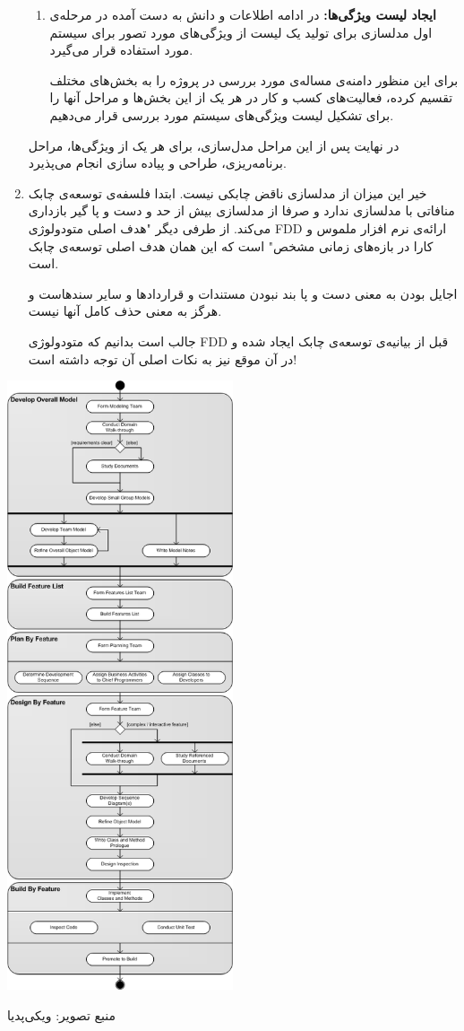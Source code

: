 \begin{enumerate}[i]
\begin{enumerate}
\item
\textbf{ایجاد لیست ویژگی‌ها:} \newline
در ادامه اطلاعات و دانش به دست آمده در مرحله‌ی اول مدلسازی برای تولید یک لیست از ویژگی‌های مورد تصور برای سیستم مورد استفاده قرار می‌گیرد.

برای این منظور دامنه‌ی مساله‌ی مورد بررسی در پروژه را به بخش‌های مختلف تقسیم کرده، فعالیت‌های کسب و کار در هر یک از این بخش‌ها و مراحل آنها را برای تشکیل لیست ویژگی‌های سیستم مورد بررسی قرار می‌دهیم.
\end{enumerate}
 
در نهایت پس از این مراحل مدل‌سازی، برای هر یک از ویژگی‌ها، مراحل برنامه‌ریزی، طراحی و پیاده سازی انجام می‌پذیرد.
 \cite{wikipedia-fdd}
 
\item
خیر این میزان از مدلسازی ناقض چابکی نیست. ابتدا فلسفه‌ی توسعه‌ی چابک منافاتی با مدلسازی ندارد و صرفا از مدلسازی بیش از حد و دست و پا گیر بازداری می‌کند.  از طرفی دیگر "هدف اصلی متودولوژی FDD ارائه‌ی نرم افزار ملموس و کارا در بازه‌های زمانی مشخص"
\cite{wikipedia-fdd}
 است که این همان هدف اصلی توسعه‌ی چابک است.

اجایل بودن به معنی دست و پا بند نبودن مستندات و قرارداد‌ها و سایر سند‌هاست و هرگز به معنی حذف کامل آنها نیست.


جالب است بدانیم که متودولوژی FDD قبل از بیانیه‌ی توسعه‌ی چابک ایجاد شده و در آن موقع نیز به نکات اصلی آن توجه داشته است!
\cite{why-fdd-is-agile}

\end{enumerate}

\begin{center}
\includegraphics[width=0.5\textwidth]{images/Fdd_process_diagram}

منبع تصویر: ویکی‌پدیا
\end{center}

